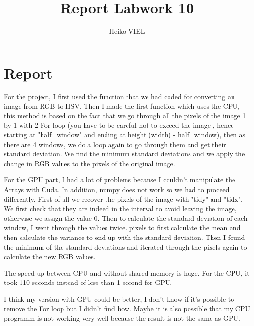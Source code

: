 \documentclass{article}
\title{Report Labwork 10}
\author{Heiko VIEL}
\begin{document}
\maketitle

\section{Report}

For the project, I first used the function that we had coded for converting an image from RGB to HSV. Then I made the first function which uses the CPU, this method is based on the fact that we go through all the pixels of the image 1 by 1 with 2 For loop (you have to be careful not to exceed the image , hence starting at "half\_window" and ending at height (width) - half\_window), then as there are 4 windows, we do a loop again to go through them and get their standard deviation. We find the minimum standard deviations and we apply the change in RGB values to the pixels of the original image.

For the GPU part, I had a lot of problems because I couldn't manipulate the Arrays with Cuda. In addition, numpy does not work so we had to proceed differently. First of all we recover the pixels of the image with "tidy" and "tidx". We first check that they are indeed in the interval to avoid leaving the image, otherwise we assign the value 0. Then to calculate the standard deviation of each window, I went through the values twice. pixels to first calculate the mean and then calculate the variance to end up with the standard deviation. Then I found the minimum of the standard deviations and iterated through the pixels again to calculate the new RGB values.

The speed up between CPU and without-shared memory is huge. For the CPU, it took 110 seconds instead of less than 1 second for GPU.

I think my version with GPU could be better, I don't know if it's possible to remove the For loop but I didn't find how. Maybe it is also possible that my CPU programm is not working very well because the result is not the same as GPU.
\end{document}
